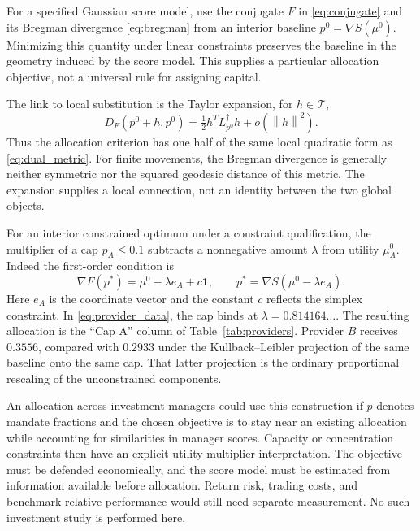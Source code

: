 \documentclass[11pt]{amsart}
\newcommand{\one}{\mathbf 1}
\newcommand{\norm}[1]{\left\lVert#1\right\rVert}
\theoremstyle{definition}
\begin{document}
For a specified Gaussian score model, use the conjugate $F$ in
\eqref{eq:conjugate} and its Bregman divergence \eqref{eq:bregman} from an
interior baseline $p^0=\nabla S(\mu^0)$.
Minimizing this quantity under linear constraints preserves the baseline in the geometry induced by the score model. This supplies a particular allocation objective, not a universal rule for assigning capital.

The link to local substitution is the Taylor expansion, for $h\in\mathcal T$,
\begin{equation}\label{eq:bregman_local}
 D_F(p^0+h,p^0)=\tfrac12h^TL_{p^0}^\dagger h+o(\norm{h}^2).
\end{equation}
Thus the allocation criterion has one half of the same local quadratic
form as \eqref{eq:dual_metric}. For finite movements, the Bregman divergence
is generally neither symmetric nor the squared geodesic distance of this
metric. The expansion supplies a local connection, not an identity between
the two global objects.

For an interior constrained optimum under a constraint qualification, the multiplier of a cap $p_A\leq0.1$ subtracts a nonnegative amount $\lambda$ from utility $\mu_A^0$. Indeed the first-order condition is
\[
 \nabla F(p^*)=\mu^0-\lambda e_A+c\one,
 \qquad p^*=\nabla S(\mu^0-\lambda e_A).
\]
Here $e_A$ is the coordinate vector and the constant $c$ reflects the simplex constraint. In \eqref{eq:provider_data}, the cap binds at $\lambda=0.814164\ldots$. The resulting allocation is the ``Cap A'' column of Table~\ref{tab:providers}. Provider $B$ receives $0.3556$, compared with $0.2933$ under the Kullback--Leibler projection of the same baseline onto the same cap. That latter projection is the ordinary proportional rescaling of the unconstrained components.

An allocation across investment managers could use this construction if $p$ denotes mandate fractions and the chosen objective is to stay near an existing allocation while accounting for similarities in manager scores. Capacity or concentration constraints then have an explicit utility-multiplier interpretation. The objective must be defended economically, and the score model must be estimated from information available before allocation. Return risk, trading costs, and benchmark-relative performance would still need separate measurement. No such investment study is performed here.
\end{document}
